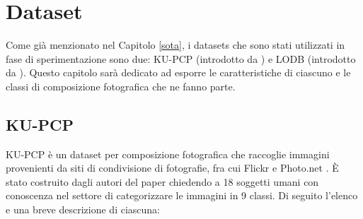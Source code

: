 \chapter{Dataset}
\label{datasets}
Come già menzionato nel Capitolo \ref{sota}, i datasets che sono stati utilizzati in fase di sperimentazione sono due: KU-PCP (introdotto da \cite{composition_dominant_geometric}) e LODB (introdotto da \cite{graph}). Questo capitolo sarà dedicato ad esporre le caratteristiche di ciascuno e le classi di composizione fotografica che ne fanno parte.

\section{KU-PCP}
\label{kupcp}
KU-PCP è un dataset per composizione fotografica che raccoglie immagini provenienti da siti di condivisione di fotografie, fra cui Flickr \cite{flickr} e Photo.net \cite{photonet}. È stato costruito dagli autori del paper \cite{composition_dominant_geometric} chiedendo a 18 soggetti umani con conoscenza nel settore di categorizzare le immagini in 9 classi. Di seguito l'elenco e una breve descrizione di ciascuna:
